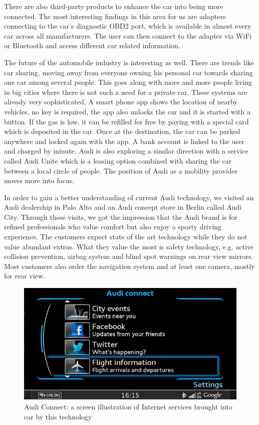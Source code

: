 There are also third-party products to enhance the car into being more connected. The most interesting findings in this area for us are adapters connecting to the car's diagnostic OBD2 port, which is available in almost every car across all manufacturers. The user can then connect to the adapter via WiFi or Bluetooth and access different car related information.

The future of the automobile industry is interesting as well. There are trends like car sharing, moving away from everyone owning his personal car towards sharing one car among several people. This goes along with more and more people living in big cities where there is not such a need for a private car. These systems are already very sophisticated. A smart phone app shows the location of nearby vehicles, no key is required, the app also unlocks the car and it is started with a button. If the gas is low, it can be refilled for free by paying with a special card which is deposited in the car. Once at the destination, the car can be parked anywhere and locked again with the app. A bank account is linked to the user and charged by minute. Audi is also exploring a similar direction with a service called Audi Unite which is a leasing option combined with sharing the car between a local circle of people. The position of Audi as a mobility provider moves more into focus.



In order to gain a better understanding of current Audi technology, we visited an Audi dealership in Palo Alto and an Audi concept store in Berlin called Audi City. Through these visits, we got the impression that the Audi brand is for refined professionals who value comfort but also enjoy a sporty driving experience. The customers expect state of the art technology while they do not value abundant extras. What they value the most is safety technology, e.g. active collision prevention, airbag system and blind spot warnings on rear view mirrors. Most customers also order the navigation system and at least one camera, mostly for rear view.

\begin{figure}
\centering
	\includegraphics[keepaspectratio, width=5in]{Figures/BenchmarkingOld/Audi_Connect.jpg}
	\caption{Audi Connect: a screen illustration of Internet services brought into car by this technology}
	\label{fig:audi_connect}

\end{figure}

